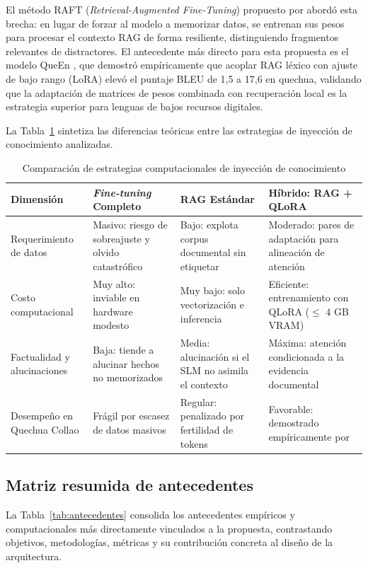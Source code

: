 El método RAFT (\textit{Retrieval-Augmented Fine-Tuning}) propuesto por \citet{Zhang2024RAFT} abordó esta brecha: en lugar de forzar al modelo a memorizar datos, se entrenan sus pesos para procesar el contexto RAG de forma resiliente, distinguiendo fragmentos relevantes de distractores. El antecedente más directo para esta propuesta es el modelo QueEn \citep{Chen2024}, que demostró empíricamente que acoplar RAG léxico con ajuste de bajo rango (LoRA) elevó el puntaje BLEU de 1,5 a 17,6 en quechua, validando que la adaptación de matrices de pesos combinada con recuperación local es la estrategia superior para lenguas de bajos recursos digitales.

La Tabla~\ref{tab:comparativa_ft_rag_prompt} sintetiza las diferencias teóricas entre las estrategias de inyección de conocimiento analizadas.

\begin{table}[H]
\centering
\caption{Comparación de estrategias computacionales de inyección de conocimiento}
\label{tab:comparativa_ft_rag_prompt}
\small
\begin{tabularx}{\textwidth}{@{}p{3.2cm}XXX@{}}
\toprule
\rowcolor{tcAzul!12}
\textbf{Dimensión} & \textbf{\textit{Fine-tuning} Completo} & \textbf{RAG Estándar} & \textbf{Híbrido: RAG + QLoRA} \\
\midrule
Requerimiento de datos & Masivo: riesgo de sobreajuste y olvido catastrófico & Bajo: explota corpus documental sin etiquetar & Moderado: pares de adaptación para alineación de atención \\
\midrule
Costo computacional & Muy alto: inviable en hardware modesto & Muy bajo: solo vectorización e inferencia & Eficiente: entrenamiento con QLoRA ($\le$ 4 GB VRAM) \\
\midrule
Factualidad y alucinaciones & Baja: tiende a alucinar hechos no memorizados & Media: alucinación si el SLM no asimila el contexto & Máxima: atención condicionada a la evidencia documental \\
\midrule
Desempeño en Quechua Collao & Frágil por escasez de datos masivos \citep{SullaTorres2024} & Regular: penalizado por fertilidad de tokens \citep{Court2024} & Favorable: demostrado empíricamente por \citet{Chen2024} \\
\bottomrule
\end{tabularx}
\end{table}

\subsection{Matriz resumida de antecedentes}
La Tabla~\ref{tab:antecedentes} consolida los antecedentes empíricos y computacionales más directamente vinculados a la propuesta, contrastando objetivos, metodologías, métricas y su contribución concreta al diseño de la arquitectura.

